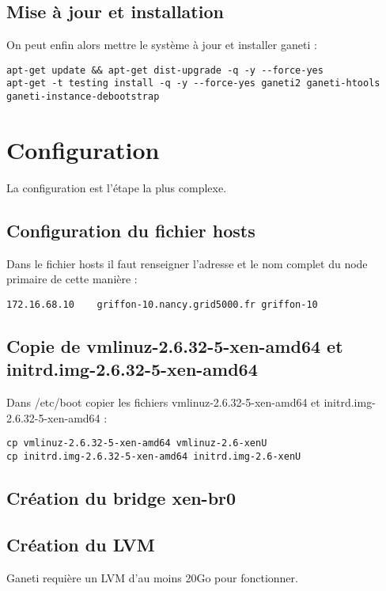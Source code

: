 \subsection {Mise à jour et installation}
On peut enfin alors mettre le système à jour et installer ganeti :

\begin{lstlisting}
apt-get update && apt-get dist-upgrade -q -y --force-yes
apt-get -t testing install -q -y --force-yes ganeti2 ganeti-htools ganeti-instance-debootstrap
\end{lstlisting}

\section {Configuration}

La configuration est l'étape la plus complexe.

\subsection {Configuration du fichier hosts}

Dans le fichier hosts il faut renseigner l'adresse et le nom complet du node primaire de cette manière :
\begin{lstlisting}
172.16.68.10    griffon-10.nancy.grid5000.fr griffon-10
\end{lstlisting}
\subsection {Copie de vmlinuz-2.6.32-5-xen-amd64 et initrd.img-2.6.32-5-xen-amd64}
Dans /etc/boot copier les fichiers vmlinuz-2.6.32-5-xen-amd64 et initrd.img-2.6.32-5-xen-amd64 :
\begin{lstlisting}
cp vmlinuz-2.6.32-5-xen-amd64 vmlinuz-2.6-xenU
cp initrd.img-2.6.32-5-xen-amd64 initrd.img-2.6-xenU
\end{lstlisting}

\subsection {Création du bridge xen-br0}

\subsection {Création du LVM}

Ganeti requière un LVM d'au moins 20Go pour fonctionner.

